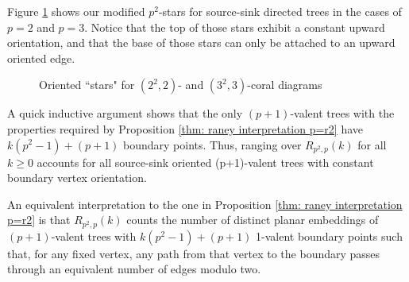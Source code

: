 \documentclass[documentfleqn,12pt]{amsart}
\begin{document}
Figure \ref{fig: oriented p2 stars} shows our modified $p^2$-stars for source-sink directed trees in the cases of $p=2$ and $p=3$.  Notice that the top of those stars exhibit a constant upward orientation, and that the base of those stars can only be attached to an upward oriented edge.

\begin{figure}[h!]
\centering
{}
\hspace{.5in}
\caption{Oriented ``stars" for $(2^2,2)$- and $(3^2,3)$-coral diagrams}
\label{fig: oriented p2 stars}
\end{figure}

A quick inductive argument shows that the only $(p+1)$-valent trees with the properties required by Proposition \ref{thm: raney interpretation p=r2} have $k(p^2-1)+(p+1)$ boundary points.  Thus, ranging over $R_{p^2,p}(k)$ for all $k \geq 0$ accounts for all source-sink oriented (p+1)-valent trees with constant boundary vertex orientation.

An equivalent interpretation to the one in Proposition \ref{thm: raney interpretation p=r2} is that $R_{p^2,p}(k)$ counts the number of distinct planar embeddings of $(p+1)$-valent trees with $k(p^2-1) + (p+1)$ 1-valent boundary points such that, for any fixed vertex, any path from that vertex to the boundary passes through an equivalent number of edges modulo two.
\end{document}
